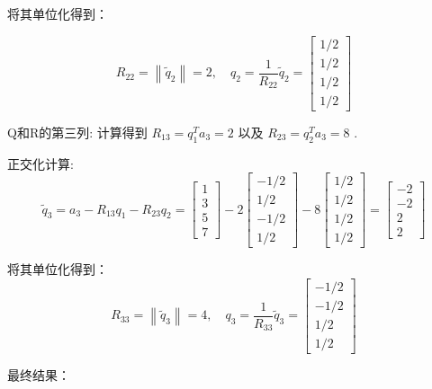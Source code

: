 \begin{example}
将其单位化得到：

\begin{equation}
R_{22}=\left\|\tilde{q}_{2}\right\|=2, \quad q_{2}=\frac{1}{R_{22}} \tilde{q}_{2}=\left[\begin{array}{c}
1 / 2 \\
1 / 2 \\
1 / 2 \\
1 / 2
\end{array}\right]
\end{equation}

Q和R的第三列:
计算得到 $R_{13}=q_{1}^{T} a_{3}=2$ 以及 $R_{23}=q_{2}^{T} a_{3}=8$ .

正交化计算:
$$\tilde{q}_{3}=a_{3}-R_{13} q_{1}-R_{23} q_{2}=\left[\begin{array}{l}1 \\ 3 \\ 5 \\ 7\end{array}\right]-2\left[\begin{array}{r}-1 / 2 \\ 1 / 2 \\ -1 / 2 \\ 1 / 2\end{array}\right]-8\left[\begin{array}{l}1 / 2 \\ 1 / 2 \\ 1 / 2 \\ 1 / 2\end{array}\right]=\left[\begin{array}{r}-2 \\ -2 \\ 2 \\ 2\end{array}\right]$$

将其单位化得到：
\begin{equation}
R_{33}=\left\|\tilde{q}_{3}\right\|=4, \quad q_{3}=\frac{1}{R_{33}} \tilde{q}_{3}=\left[\begin{array}{c}
-1 / 2 \\
-1 / 2 \\
1 / 2 \\
1 / 2
\end{array}\right]
\end{equation}

最终结果：


\end{example}
